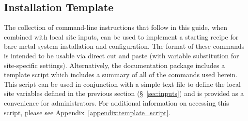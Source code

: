 \subsection{Installation Template}
The collection of command-line instructions that follow in this guide, when
combined with local site inputs, can be used to implement a starting recipe for
bare-metal system installation and configuration. The format of these commands
is intended to be usable via direct cut and paste (with variable substitution
for site-specific settings). Alternatively, the \FSP{} documentation package
includes a template script which includes a summary of all of the commands used
herein. This script can be used in conjunction with a simple text file to
define the local site variables defined in the previous section
(\S~\ref{sec:inputs}) and is provided as a convenience for administrators.  For
additional information on accessing this script, please see
Appendix~\ref{appendix:template_script}.








